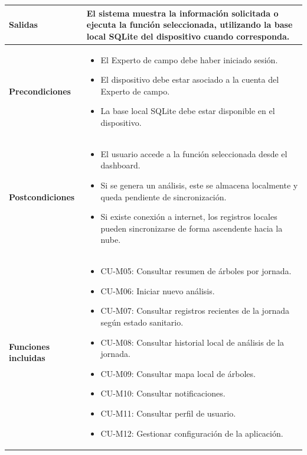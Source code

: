 \begin{longtable}{|p{3.3cm}|p{10cm}|}
\textbf{Salidas} & 
El sistema muestra la información solicitada o ejecuta la función seleccionada, utilizando la base local SQLite del dispositivo cuando corresponda. \\ \hline

\textbf{Precondiciones} & 
\begin{itemize}
    \item El Experto de campo debe haber iniciado sesión.
    \item El dispositivo debe estar asociado a la cuenta del Experto de campo.
    \item La base local SQLite debe estar disponible en el dispositivo.
\end{itemize} \\ \hline

\textbf{Postcondiciones} & 
\begin{itemize}
    \item El usuario accede a la función seleccionada desde el dashboard.
    \item Si se genera un análisis, este se almacena localmente y queda pendiente de sincronización.
    \item Si existe conexión a internet, los registros locales pueden sincronizarse de forma ascendente hacia la nube.
\end{itemize} \\ \hline

\textbf{Funciones incluidas} &
\begin{itemize}
    \item CU-M05: Consultar resumen de árboles por jornada.
    \item CU-M06: Iniciar nuevo análisis.
    \item CU-M07: Consultar registros recientes de la jornada según estado sanitario.
    \item CU-M08: Consultar historial local de análisis de la jornada.
    \item CU-M09: Consultar mapa local de árboles.
    \item CU-M10: Consultar notificaciones.
    \item CU-M11: Consultar perfil de usuario.
    \item CU-M12: Gestionar configuración de la aplicación.
\end{itemize} \\ \hline


\end{longtable}
